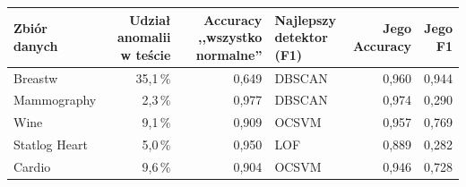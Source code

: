 \begin{tabular}{lrrlrr}
\toprule
Zbiór danych & \makecell[r]{Udział anomalii\\w teście} & \makecell[r]{Accuracy\\,,wszystko normalne''} & \makecell[l]{Najlepszy\\detektor (F1)} & \makecell[r]{Jego\\Accuracy} & \makecell[r]{Jego\\F1} \\
\midrule
Breastw & 35,1\,\% & 0,649 & DBSCAN & 0,960 & 0,944 \\
Mammography & 2,3\,\% & 0,977 & DBSCAN & 0,974 & 0,290 \\
Wine & 9,1\,\% & 0,909 & OCSVM & 0,957 & 0,769 \\
Statlog Heart & 5,0\,\% & 0,950 & LOF & 0,889 & 0,282 \\
Cardio & 9,6\,\% & 0,904 & OCSVM & 0,946 & 0,728 \\
\bottomrule
\end{tabular}
